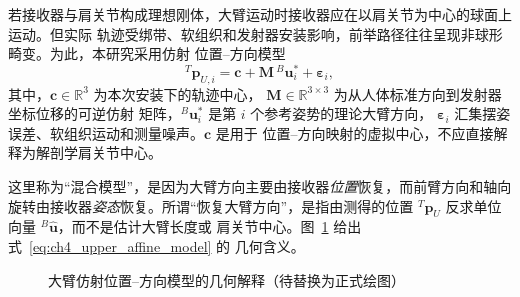 若接收器与肩关节构成理想刚体，大臂运动时接收器应在以肩关节为中心的球面上运动。但实际
轨迹受绑带、软组织和发射器安装影响，前举路径往往呈现非球形畸变。为此，本研究采用仿射
位置--方向模型
\begin{equation}
  {}^{T}\boldsymbol p_{U,i}
  =\boldsymbol c+\boldsymbol M\,{}^{B}\boldsymbol u_i^{*}
  +\boldsymbol\varepsilon_i,
  \label{eq:ch4_upper_affine_model}
\end{equation}
其中，$\boldsymbol c\in\mathbb R^3$ 为本次安装下的轨迹中心，
$\boldsymbol M\in\mathbb R^{3\times3}$ 为从人体标准方向到发射器坐标位移的可逆仿射
矩阵，${}^{B}\boldsymbol u_i^{*}$ 是第 $i$ 个参考姿势的理论大臂方向，
$\boldsymbol\varepsilon_i$ 汇集摆姿误差、软组织运动和测量噪声。$\boldsymbol c$ 是用于
位置--方向映射的虚拟中心，不应直接解释为解剖学肩关节中心。

这里称为“混合模型”，是因为大臂方向主要由接收器\emph{位置}恢复，而前臂方向和轴向
旋转由接收器\emph{姿态}恢复。所谓“恢复大臂方向”，是指由测得的位置
${}^{T}\boldsymbol p_U$ 反求单位向量 ${}^{B}\hat{\boldsymbol u}$，而不是估计大臂长度或
肩关节中心。图~\ref{fig:ch4_affine_geometry} 给出式~\eqref{eq:ch4_upper_affine_model} 的
几何含义。

\begin{figure}[htbp]
  \centering
  \caption{大臂仿射位置--方向模型的几何解释（待替换为正式绘图）}
  \label{fig:ch4_affine_geometry}
\end{figure}


